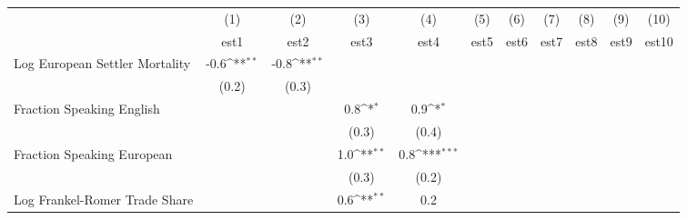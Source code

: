 {
\def\sym#1{\ifmmode^{#1}\else\(^{#1}\)\fi}
\begin{tabular}{l*{10}{c}}
                    &\multicolumn{1}{c}{(1)}         &\multicolumn{1}{c}{(2)}         &\multicolumn{1}{c}{(3)}         &\multicolumn{1}{c}{(4)}         &\multicolumn{1}{c}{(5)}         &\multicolumn{1}{c}{(6)}         &\multicolumn{1}{c}{(7)}         &\multicolumn{1}{c}{(8)}         &\multicolumn{1}{c}{(9)}         &\multicolumn{1}{c}{(10)}         \\
                    &        est1         &        est2         &        est3         &        est4         &        est5         &        est6         &        est7         &        est8         &        est9         &       est10         \\
Log European Settler Mortality&        -0.6\sym{**} &        -0.8\sym{**} &                     &                     &                     &                     &                     &                     &                     &                     \\
                    &       (0.2)         &       (0.3)         &                     &                     &                     &                     &                     &                     &                     &                     \\
Fraction Speaking English&                     &                     &         0.8\sym{*}  &         0.9\sym{*}  &                     &                     &                     &                     &                     &                     \\
                    &                     &                     &       (0.3)         &       (0.4)         &                     &                     &                     &                     &                     &                     \\
Fraction Speaking European&                     &                     &         1.0\sym{**} &         0.8\sym{***}&                     &                     &                     &                     &                     &                     \\
                    &                     &                     &       (0.3)         &       (0.2)         &                     &                     &                     &                     &                     &                     \\
Log Frankel-Romer Trade Share&                     &                     &         0.6\sym{**} &         0.2         &                     &                     &                     &                     &                     &                     \\

\end{tabular}}
